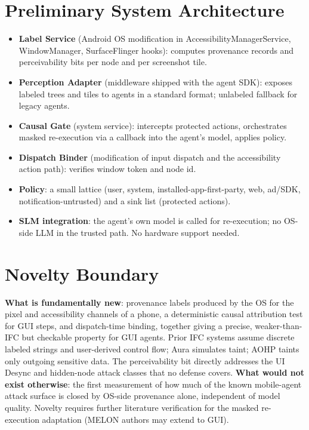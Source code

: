\documentclass[11pt]{article}
\begin{document}
\section{Preliminary System Architecture}
\begin{itemize}
  \item \textbf{Label Service} (Android OS modification in AccessibilityManagerService, WindowManager, SurfaceFlinger hooks): computes provenance records and perceivability bits per node and per screenshot tile.
  \item \textbf{Perception Adapter} (middleware shipped with the agent SDK): exposes labeled trees and tiles to agents in a standard format; unlabeled fallback for legacy agents.
  \item \textbf{Causal Gate} (system service): intercepts protected actions, orchestrates masked re-execution via a callback into the agent's model, applies policy.
  \item \textbf{Dispatch Binder} (modification of input dispatch and the accessibility action path): verifies window token and node id.
  \item \textbf{Policy}: a small lattice (user, system, installed-app-first-party, web, ad/SDK, notification-untrusted) and a sink list (protected actions).
  \item \textbf{SLM integration}: the agent's own model is called for re-execution; no OS-side LLM in the trusted path. No hardware support needed.
\end{itemize}

\section{Novelty Boundary}
\textbf{What is fundamentally new}: provenance labels produced by the OS for the pixel and accessibility channels of a phone, a deterministic causal attribution test for GUI steps, and dispatch-time binding, together giving a precise, weaker-than-IFC but checkable property for GUI agents. Prior IFC systems assume discrete labeled strings and user-derived control flow; Aura simulates taint; AOHP taints only outgoing sensitive data. The perceivability bit directly addresses the UI Desync and hidden-node attack classes that no defense covers. \textbf{What would not exist otherwise}: the first measurement of how much of the known mobile-agent attack surface is closed by OS-side provenance alone, independent of model quality. Novelty requires further literature verification for the masked re-execution adaptation (MELON authors may extend to GUI).
\end{document}
